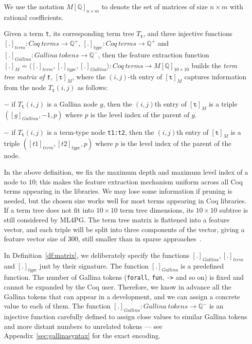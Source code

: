 We use the notation $M[\mathbb{Q}]_{n\times m}$ to denote the set of matrices of size  $n\times m$ with rational coefficients.


\begin{definition}\label{df:matrix}
Given a term \lstinline?t?, its corresponding term tree $T_{\texttt{t}}$, and three injective functions
$[.]_{term}: Coq~terms \rightarrow \mathbb{Q}^+$, $[.]_{type}: Coq~terms \rightarrow \mathbb{Q}^+$
and $[.]_{Gallina}: Gallina~tokens \rightarrow \mathbb{Q}^-$, then the feature extraction function
$[.]_M=\langle[.]_{term}, [.]_{type},[.]_{Gallina}\rangle : Coq~terms \rightarrow M[\mathbb{Q}]_{10\times 10}$
builds the  \emph{term tree matrix of \texttt{t}}, $[\texttt{t}]_M$,
where the $(i,j)$-th entry of $[\texttt{t}]_M$ captures information from the node $T_{\texttt{t}}(i,j)$ as follows:

$-$ if $T_{\texttt{t}}(i,j)$ is a Gallina node $g$, then the $(i,j)$th entry of $[\texttt{t}]_M$ is a triple $([g]_{Gallina},-1,p)$
where $p$ is the level index of the parent of $g$.

$-$ if $T_{\texttt{t}}(i,j)$ is a term-type node \lstinline?t1:t2?, then the $(i,j)$th entry of $[\texttt{t}]_M$ is a triple $([t1]_{term},[t2]_{type},p)$
where $p$ is the level index of the parent of the node.




\end{definition}




In the above definition, we fix  the maximum depth and  maximum level index of a node to $10$; this makes the feature extraction mechanism uniform
across all Coq terms appearing in the libraries. We may lose some information if  pruning is needed, but the chosen size works well for most terms appearing in Coq libraries.
If a term tree does not fit into $10 \times 10$ term tree dimensions, its $10 \times 10$
subtree is still considered by ML4PG.
The term tree matrix is flattened into a feature vector, and each triple will be split
into three components of the vector, giving a feature vector size of $300$,
still smaller than in sparse approaches~\cite{lpar-urban,K13,UrbanSPV08}.


In Definition~\ref{df:matrix}, we deliberately specify the functions $[.]_{Gallina}, [.]_{term}$ and $[.]_{type}$ just by their signature.
The function $[.]_{Gallina}$ is a predefined function.
The number of Gallina tokens (\lstinline?forall?, \lstinline?fun?, \lstinline?->? and so on) is fixed and cannot be
expanded by the Coq user. Therefore, we know in advance all the Gallina tokens that can appear in a development, and we can
assign a concrete value to each of them. The function $[.]_{Gallina}: Gallina~tokens  \rightarrow \mathbb{Q}^-$ is an injective
function carefully defined to assign close values to similar Gallina tokens
and more distant numbers to unrelated tokens
--- see Appendix~\ref{sec:gallinasyntax} for the exact encoding.


